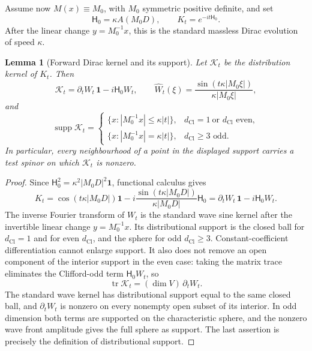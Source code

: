 \documentclass[11pt]{article}
\newtheorem{lemma}[theorem]{Lemma}
\theoremstyle{definition}
\theoremstyle{remark}
\newcommand{\dCl}{d_{\mathrm{Cl}}}
\newcommand{\supp}{\operatorname{supp}}
\newcommand{\one}{\mathbf{1}}
\newcommand{\Ham}{\mathsf{H}}
\begin{document}
Assume now \(M(x)\equiv M_0\), with \(M_0\) symmetric positive definite, and set
\[
 \Ham_0=\kappa A(M_0D),\qquad
 K_t=e^{-it\Ham_0}.
\]
After the linear change \(y=M_0^{-1}x\), this is the standard massless Dirac
evolution of speed \(\kappa\).

\begin{lemma}[Forward Dirac kernel and its support]
\label{lem:constant-dirac-kernel}
Let \(\mathcal K_t\) be the distribution kernel of \(K_t\).  Then
\[
 \mathcal K_t
 =\partial_tW_t\,\one-i\Ham_0W_t,
 \qquad
 \widehat W_t(\xi)=\frac{\sin(t\kappa|M_0\xi|)}
                        {\kappa|M_0\xi|},
\]
and
\[
 \supp\mathcal K_t=
 \begin{cases}
 \{x:|M_0^{-1}x|\le\kappa|t|\},
      & \dCl=1\ \text{or }\dCl\text{ even},\\[2mm]
 \{x:|M_0^{-1}x|=\kappa|t|\},
      & \dCl\ge3\text{ odd}.
 \end{cases}
\]
In particular, every neighbourhood of a point in the displayed support carries
a test spinor on which \(\mathcal K_t\) is nonzero.
\end{lemma}

\begin{proof}
Since
\(\Ham_0^2=\kappa^2|M_0D|^2\one\), functional calculus gives
\[
 K_t=\cos(t\kappa|M_0D|)\one
     -i\frac{\sin(t\kappa|M_0D|)}
              {\kappa|M_0D|}\Ham_0
     =\partial_tW_t\,\one-i\Ham_0W_t.
\]
The inverse Fourier transform of \(W_t\) is the standard wave sine kernel after
the invertible linear change \(y=M_0^{-1}x\).  Its distributional support is the
closed ball for \(\dCl=1\) and for even \(\dCl\), and the sphere for odd
\(\dCl\ge3\).  Constant-coefficient differentiation cannot enlarge support.
It also does not remove an open component of the interior support in the even
case: taking the matrix trace eliminates the Clifford-odd term
\(\Ham_0W_t\), so
\[
 \operatorname{tr}\mathcal K_t
 =(\dim V)\,\partial_tW_t.
\]
The standard wave kernel has distributional support equal to the same closed
ball, and \(\partial_tW_t\) is nonzero on every nonempty open subset of its
interior.  In odd dimension both terms are supported on the characteristic
sphere, and the nonzero wave front amplitude gives the full sphere as support.
The last assertion is precisely the definition of distributional support.
\end{proof}
\end{document}
